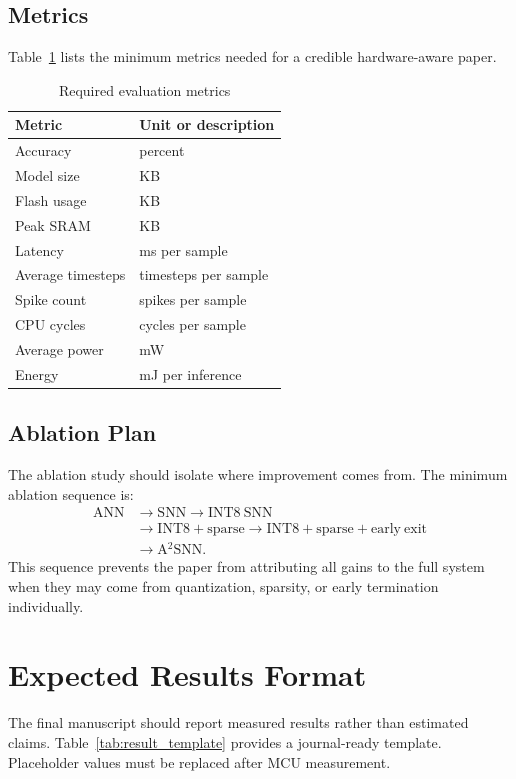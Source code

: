 \documentclass[journal]{IEEEtran}
\newcommand{\modelname}{A$^2$SNN}
\begin{document}
\subsection{Metrics}
Table~\ref{tab:metrics} lists the minimum metrics needed for a credible hardware-aware paper.

\begin{table}[t]
\centering
\caption{Required evaluation metrics}
\label{tab:metrics}
\begin{tabular}{ll}
\toprule
Metric & Unit or description \\
\midrule
Accuracy & percent \\
Model size & KB \\
Flash usage & KB \\
Peak SRAM & KB \\
Latency & ms per sample \\
Average timesteps & timesteps per sample \\
Spike count & spikes per sample \\
CPU cycles & cycles per sample \\
Average power & mW \\
Energy & mJ per inference \\
\bottomrule
\end{tabular}
\end{table}

\subsection{Ablation Plan}
The ablation study should isolate where improvement comes from. The minimum ablation sequence is:
\begin{equation}
\begin{split}
\mathrm{ANN} &\rightarrow \mathrm{SNN} \rightarrow \mathrm{INT8\ SNN} \\
&\rightarrow \mathrm{INT8+sparse} \rightarrow \mathrm{INT8+sparse+early\ exit}\\
&\rightarrow \text{\modelname}.
\end{split}
\end{equation}
This sequence prevents the paper from attributing all gains to the full system when they may come from quantization, sparsity, or early termination individually.

\section{Expected Results Format}
The final manuscript should report measured results rather than estimated claims. Table~\ref{tab:result_template} provides a journal-ready template. Placeholder values must be replaced after MCU measurement.
\end{document}
